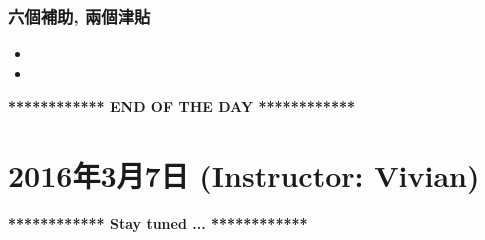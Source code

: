 \subsubsection*{六個補助, 兩個津貼}
\begin{itemize}
  \itemsep0em
  \item {}
  \item {}
\end{itemize}

\vspace{15mm}

\begin{center}
  \textbf{************ END OF THE DAY ************}
\end{center}
\newpage

\section{2016年3月7日 (Instructor: Vivian)}

\vspace{15mm}
\begin{center}
  \textbf{************ Stay tuned ... ************}
\end{center}